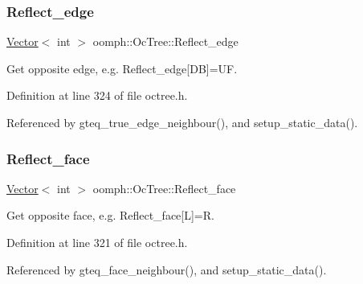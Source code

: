 \mbox{\label{classoomph_1_1OcTree_aeb757b41fc1c4b7ea697de40c19b6c36}} 
\subsubsection{\texorpdfstring{Reflect\+\_\+edge}{Reflect\_edge}}
{\footnotesize\ttfamily \hyperlink{classoomph_1_1Vector}{Vector}$<$ int $>$ oomph\+::\+Oc\+Tree\+::\+Reflect\+\_\+edge\hspace{0.3cm}{\ttfamily [static]}}



Get opposite edge, e.\+g. Reflect\+\_\+edge\mbox{[}DB\mbox{]}=UF. 



Definition at line 324 of file octree.\+h.



Referenced by gteq\+\_\+true\+\_\+edge\+\_\+neighbour(), and setup\+\_\+static\+\_\+data().

\mbox{\label{classoomph_1_1OcTree_a50b5b6208e34976cb3fd50e84b5c2d05}} 
\subsubsection{\texorpdfstring{Reflect\+\_\+face}{Reflect\_face}}
{\footnotesize\ttfamily \hyperlink{classoomph_1_1Vector}{Vector}$<$ int $>$ oomph\+::\+Oc\+Tree\+::\+Reflect\+\_\+face\hspace{0.3cm}{\ttfamily [static]}}



Get opposite face, e.\+g. Reflect\+\_\+face\mbox{[}L\mbox{]}=R. 



Definition at line 321 of file octree.\+h.



Referenced by gteq\+\_\+face\+\_\+neighbour(), and setup\+\_\+static\+\_\+data().

\mbox{\label{classoomph_1_1OcTree_acee0e40be5a1aa25e7356e23ec327636}} 
